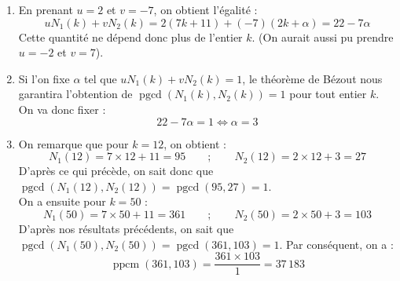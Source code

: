 \documentclass[11pt,class=report,crop=false]{standalone}
\newcommand{\pgcd}{\mathop{\mathrm{pgcd}}\nolimits}
\newcommand{\ppcm}{\mathop{\mathrm{ppcm}}\nolimits}
\begin{document}
\correction
\sauteligne
\begin{enumerate}
    \item En prenant $u = 2$ et $v = -7$, on obtient l'égalité :
    $$ u N_1(k) + v N_2(k) = 2 ( 7k+11) + (-7) ( 2k + \alpha) = 22 - 7 \alpha $$
    Cette quantité ne dépend donc plus de l'entier $k$. (On aurait aussi pu prendre $u=-2$ et $v=7$).
    
    \item Si l'on fixe $\alpha$ tel que $ u N_1(k) + v N_2(k) = 1$, le théorème de Bézout nous garantira l'obtention de $\pgcd(N_1(k) , N_2(k)) = 1$ pour tout entier $k$. On va donc fixer :
    $$ 22 - 7 \alpha = 1 \iff \alpha = 3 $$
    
    \item On remarque que pour $k=12$, on obtient :
    $$ N_1(12) = 7 \times 12 + 11 = 95 \qquad ; \qquad N_2(12) = 2 \times 12 + 3 = 27 $$
    D'après ce qui précède, on sait donc que $\pgcd(N_1(12) , N_2(12)) = \pgcd(95,27) = 1$.\\
    On a ensuite pour $k = 50$ :
    $$ N_1(50) = 7 \times 50 + 11 = 361 \qquad ; \qquad N_2(50) = 2 \times 50 + 3 = 103 $$
    D'après nos résultats précédents, on sait que $\pgcd(N_1(50) , N_2(50)) = \pgcd(361,103) = 1$. Par conséquent, on a :
    $$ \ppcm (361,103) = \frac{361 \times 103}{1} = 37\, 183 $$
\end{enumerate}
\fincorrection
\finexercice
\end{document}
